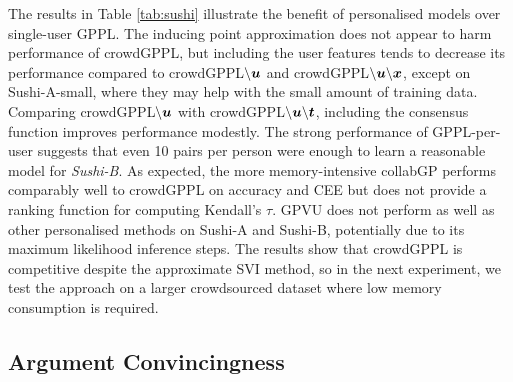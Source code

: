 The results in Table \ref{tab:sushi} 
illustrate the benefit of personalised models over single-user GPPL.
The inducing point approximation does not appear to harm performance of crowdGPPL, but
 including the user features tends to decrease its performance
compared to crowdGPPL$\backslash\boldsymbol u$ and crowdGPPL$\backslash\boldsymbol u\backslash\boldsymbol x$,
except on Sushi-A-small, where they may help with the small amount of training data.
Comparing crowdGPPL$\backslash\boldsymbol u$ with crowdGPPL$\backslash\boldsymbol u\backslash\boldsymbol t$, including the consensus function improves performance modestly.
The strong performance of GPPL-per-user 
suggests that even 10 pairs per person were enough 
to learn a reasonable model for \emph{Sushi-B}.
As expected, the more memory-intensive collabGP performs comparably well to crowdGPPL
on accuracy and CEE but does not provide a ranking function for computing Kendall's $\tau$.
GPVU does not perform as well as other personalised methods on Sushi-A and Sushi-B,
potentially due to its maximum likelihood inference steps.
The results show that crowdGPPL is competitive despite 
the approximate SVI method, 
so in the next experiment, we test the approach on a larger crowdsourced
dataset where
low memory consumption is required.


\subsection{Argument Convincingness}\label{sec:exp_scale}


